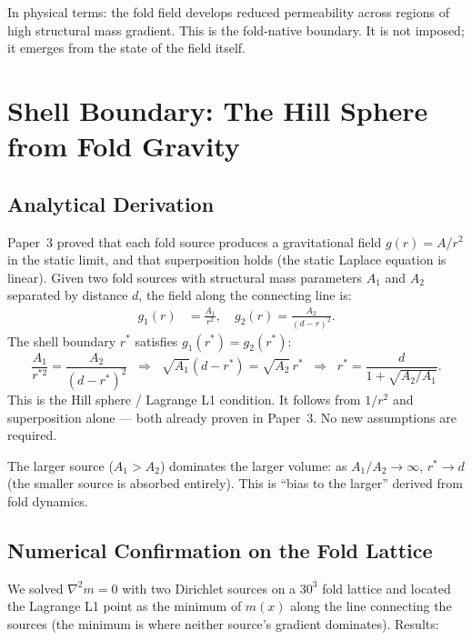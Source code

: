 \documentclass[12pt]{article}
\begin{document}
In physical terms: the fold field develops reduced permeability
across regions of high structural mass gradient. This is the
fold-native boundary. It is not imposed; it emerges from the
state of the field itself.

\section{Shell Boundary: The Hill Sphere from Fold Gravity}
\label{sec:hill}

\subsection{Analytical Derivation}

Paper~3 proved that each fold source produces a gravitational field
$g(r) = A/r^2$ in the static limit, and that superposition holds
(the static Laplace equation is linear). Given two fold sources with
structural mass parameters $A_1$ and $A_2$ separated by distance $d$,
the field along the connecting line is:
\begin{align}
  g_1(r) &= \frac{A_1}{r^2}, \quad
  g_2(r) = \frac{A_2}{(d-r)^2}.
\end{align}
The shell boundary $r^*$ satisfies $g_1(r^*) = g_2(r^*)$:
\begin{equation}
  \frac{A_1}{r^{*2}} = \frac{A_2}{(d-r^*)^2}
  \;\;\Rightarrow\;\;
  \sqrt{A_1}(d-r^*) = \sqrt{A_2}\,r^*
  \;\;\Rightarrow\;\;
  \boxed{r^* = \frac{d}{1 + \sqrt{A_2/A_1}}}.
  \label{eq:hill}
\end{equation}
This is the Hill sphere / Lagrange L1 condition. It follows from
$1/r^2$ and superposition alone --- both already proven in Paper~3.
No new assumptions are required.

The larger source ($A_1 > A_2$) dominates the larger volume:
as $A_1/A_2 \to \infty$, $r^* \to d$ (the smaller source is
absorbed entirely). This is ``bias to the larger'' derived from
fold dynamics.

\subsection{Numerical Confirmation on the Fold Lattice}

We solved $\nabla^2 m = 0$ with two Dirichlet sources on a $30^3$
fold lattice and located the Lagrange L1 point as the minimum
of $m(x)$ along the line connecting the sources (the minimum is
where neither source's gradient dominates). Results:
\end{document}
